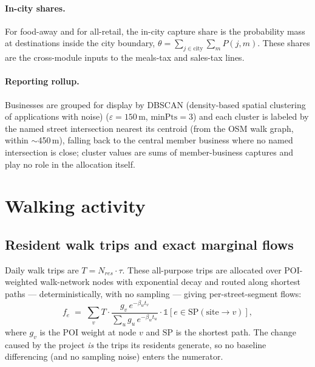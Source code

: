 \documentclass[11pt]{article}
\begin{document}
\paragraph{In-city shares.} For food-away and for all-retail, the in-city
capture share is the probability mass at destinations inside the city boundary,
$\theta = \sum_{j \in \mathrm{city}} \sum_m P(j,m)$. These shares are the
cross-module inputs to the meals-tax and sales-tax lines.

\paragraph{Reporting rollup.} Businesses are grouped for display by DBSCAN
(density-based spatial clustering of applications with noise) \cite{ester1996} ($\varepsilon = 150$\,m, $\mathrm{minPts} = 3$) and each
cluster is labeled by the named street intersection nearest its centroid
(from the OSM walk graph, within $\sim$450\,m), falling back to the central
member business where no named intersection is close; cluster values are sums
of member-business captures and play no role in the allocation itself.

\section{Walking activity}

\subsection{Resident walk trips and exact marginal flows}
Daily walk trips are $T = N_{res} \cdot \tau$. These all-purpose trips are
allocated over POI-weighted walk-network nodes with exponential decay and
routed along shortest paths --- deterministically, with no sampling --- giving
per-street-segment flows:
\begin{equation}
f_e \;=\; \sum_{v} T \cdot
\frac{g_v\, e^{-\beta_w t_v}}{\sum_u g_u\, e^{-\beta_w t_u}}
\cdot \mathbb{1}\!\left[ e \in \mathrm{SP}(\mathrm{site} \to v) \right],
\end{equation}
where $g_v$ is the POI weight at node $v$ and $\mathrm{SP}$ is the shortest
path. The change caused by the project \emph{is} the trips its residents
generate, so no baseline differencing (and no sampling noise) enters the
numerator.
\end{document}

